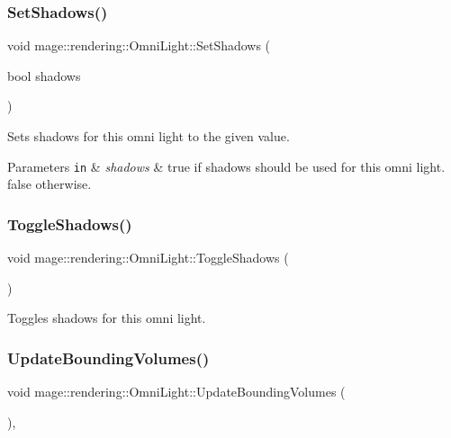 \subsubsection{\texorpdfstring{Set\+Shadows()}{SetShadows()}}
{\footnotesize\ttfamily void mage\+::rendering\+::\+Omni\+Light\+::\+Set\+Shadows (\begin{DoxyParamCaption}\item[{bool}]{shadows }\end{DoxyParamCaption})\hspace{0.3cm}{\ttfamily [noexcept]}}

Sets shadows for this omni light to the given value.


\begin{DoxyParams}[1]{Parameters}
\mbox{\tt in}  & {\em shadows} & {\ttfamily true} if shadows should be used for this omni light. {\ttfamily false} otherwise. \\
\hline
\end{DoxyParams}
\hypertarget{classmage_1_1rendering_1_1_omni_light_aa1816fad8913711c10994b66103279a2}{}\label{classmage_1_1rendering_1_1_omni_light_aa1816fad8913711c10994b66103279a2} 
\subsubsection{\texorpdfstring{Toggle\+Shadows()}{ToggleShadows()}}
{\footnotesize\ttfamily void mage\+::rendering\+::\+Omni\+Light\+::\+Toggle\+Shadows (\begin{DoxyParamCaption}{ }\end{DoxyParamCaption})\hspace{0.3cm}{\ttfamily [noexcept]}}

Toggles shadows for this omni light. \hypertarget{classmage_1_1rendering_1_1_omni_light_a44c6dee7d24c879aab0284ac21910337}{}\label{classmage_1_1rendering_1_1_omni_light_a44c6dee7d24c879aab0284ac21910337} 
\subsubsection{\texorpdfstring{Update\+Bounding\+Volumes()}{UpdateBoundingVolumes()}}
{\footnotesize\ttfamily void mage\+::rendering\+::\+Omni\+Light\+::\+Update\+Bounding\+Volumes (\begin{DoxyParamCaption}{ }\end{DoxyParamCaption})\hspace{0.3cm}{\ttfamily [private]}, {\ttfamily [noexcept]}}

